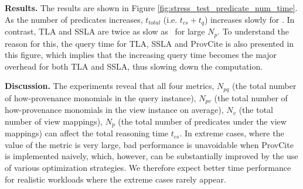 \textbf{Results.} The results are shown in Figure \ref{fig:stress_test_predicate_num_time}. As the number of predicates increases, $t_{total}$ (i.e. $t_{cs} + t_q$)
increases slowly for \provalg. In contrast, TLA and SSLA are twice as slow as \provalg\ for large $N_p$. To understand the reason for this, the query time for TLA, SSLA and ProvCite is also presented in this figure, which implies that the increasing query time becomes the major overhead for both TLA and SSLA, thus slowing down the computation.

{\bf Discussion.} The experiments reveal that all four metrics, $N_{pq}$ (the total number of how-provenance monomials in the query instance), $N_{pv}$ (the total number of how-provenance monomials in the view instance on average), $N_v$ (the total number of view mappings), $N_p$ (the total number of predicates under the view mappings) can affect the total reasoning time $t_{cs}$. In extreme cases, where the value of the metric is very large, bad performance is unavoidable when ProvCite is implemented naively, which, however, can be substantially improved by the use of various optimization strategies. We therefore expect better time performance for realistic workloads where the extreme cases rarely appear. 

